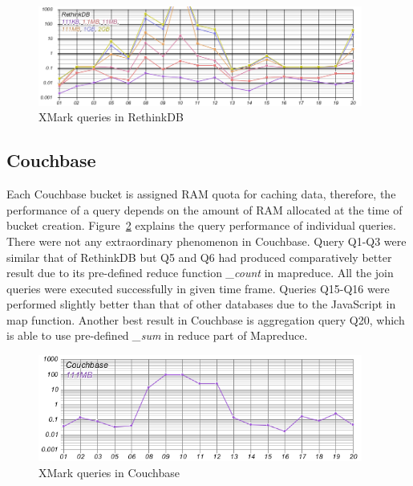 \begin{figure}
	\centering
	\includegraphics[width=0.95\textwidth]{img/result/rethinkdb/rethinkdb-all}
	\caption{XMark queries in RethinkDB}
	\label{fig:xmark-result-rethinkdb-all}
\end{figure}

\subsection{Couchbase}
Each Couchbase bucket is assigned RAM quota for caching data, therefore, the performance of a query depends on the amount of RAM allocated at the time of bucket creation. Figure~\ref{fig:xmark-result-cb-all} explains the query performance of individual queries. There were not any extraordinary phenomenon in Couchbase.  Query Q1-Q3  were similar that of RethinkDB but Q5 and Q6 had produced comparatively better result due to its pre-defined reduce function \textit{\_count} in mapreduce. All the join queries were executed successfully in given time frame. Queries Q15-Q16 were performed slightly  better than that of other databases due to the JavaScript in map function. Another best result in Couchbase is aggregation query Q20, which is able to use pre-defined \textit{\_sum} in reduce part of Mapreduce. 

\begin{figure}
	\centering
	\includegraphics[width=0.95\textwidth]{img/result/cb/cb-all}
	\caption{XMark queries in Couchbase}
	\label{fig:xmark-result-cb-all}
\end{figure}

